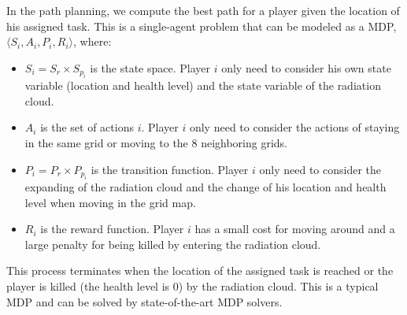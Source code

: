 In the path planning, we compute the best path for a player given
the location of his assigned task. This is a single-agent problem
that can be modeled as a MDP, $\langle S_i, A_i, P_i, R_i \rangle$,
where:
\begin{itemize}
  \item $S_i = S_r \times S_{p_i}$ is the state space. Player
      $i$ only need to consider his own state variable
      (location and health level) and the state variable of the
      radiation cloud.
  \item $A_i$ is the set of actions $i$. Player $i$ only need
      to consider the actions of staying in the same grid or
      moving to the 8 neighboring grids.
  \item $P_i = P_r \times P_{p_i}$ is the transition function.
      Player $i$ only need to consider the expanding of the
      radiation cloud and the change of his location and health
      level when moving in the grid map.
  \item $R_i$ is the reward function. Player $i$ has a small
      cost for moving around and a large penalty for being
      killed by entering the radiation cloud.
\end{itemize}
This process terminates when the location of the assigned task is
reached or the player is killed (the health level is 0) by the
radiation cloud. This is a typical MDP and can be solved by
state-of-the-art MDP solvers.

